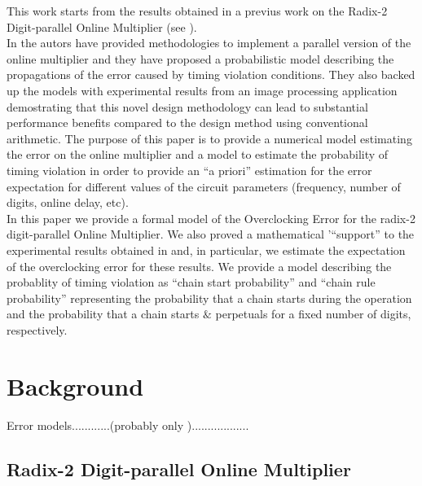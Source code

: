 \documentclass[journal]{IEEEtran}
\begin{document}
This work starts from the results obtained in a previus work on the Radix-2 Digit-parallel Online Multiplier (see \cite{onlinearith}).\\
 In \cite{onlinearith} the autors have provided methodologies to implement a parallel version of the online multiplier and they have proposed a probabilistic model describing the propagations of the error caused by timing violation conditions. They also backed up the models with experimental results from an image processing application demostrating that this novel design methodology can lead to substantial performance benefits compared to the design method using conventional arithmetic. The purpose of this paper is to provide a numerical model estimating the error on the online multiplier and a model to estimate the probability of timing violation in order to provide an ``a priori'' estimation for the error expectation for different values of the circuit parameters (frequency, number of digits, online delay, etc).  \\
In this paper we provide a formal model of the Overclocking Error for the radix-2 digit-parallel Online Multiplier. We also proved a mathematical '``support'' to the experimental results obtained in  \cite{onlinearith} and, in particular, we estimate the expectation of the overclocking error for these results. We provide a model describing the probablity of timing violation as ``chain start probability'' and ``chain rule probability'' representing the probability that a chain starts during the operation and the probability that a chain starts $\&$ perpetuals for a fixed number of digits, respectively.  \\














\section{Background}\label{Sec:Background}

Error models............(probably only \cite{onlinearith})..................


\subsection{Radix-2 Digit-parallel Online Multiplier}
\end{document}
